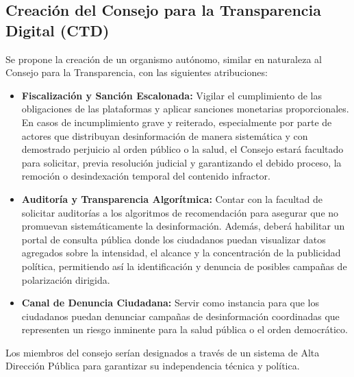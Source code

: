 \documentclass[12pt, letterpaper]{article}
\begin{document}
\subsection{Creación del Consejo para la Transparencia Digital (CTD)}
Se propone la creación de un organismo autónomo, similar en naturaleza al Consejo para la Transparencia, con las siguientes atribuciones:
\begin{itemize}[leftmargin=*, itemsep=0.5em]
	\item \textbf{Fiscalización y Sanción Escalonada:} Vigilar el cumplimiento de las obligaciones de las plataformas y aplicar sanciones monetarias proporcionales. En casos de incumplimiento grave y reiterado, especialmente por parte de actores que distribuyan desinformación de manera sistemática y con demostrado perjuicio al orden público o la salud, el Consejo estará facultado para solicitar, previa resolución judicial y garantizando el debido proceso, la remoción o desindexación temporal del contenido infractor.
	\item \textbf{Auditoría y Transparencia Algorítmica:} Contar con la facultad de solicitar auditorías a los algoritmos de recomendación para asegurar que no promuevan sistemáticamente la desinformación. Además, deberá habilitar un portal de consulta pública donde los ciudadanos puedan visualizar datos agregados sobre la intensidad, el alcance y la concentración de la publicidad política, permitiendo así la identificación y denuncia de posibles campañas de polarización dirigida.
	\item \textbf{Canal de Denuncia Ciudadana:} Servir como instancia para que los ciudadanos puedan denunciar campañas de desinformación coordinadas que representen un riesgo inminente para la salud pública o el orden democrático.
\end{itemize}
Los miembros del consejo serían designados a través de un sistema de Alta Dirección Pública para garantizar su independencia técnica y política.
\end{document}
